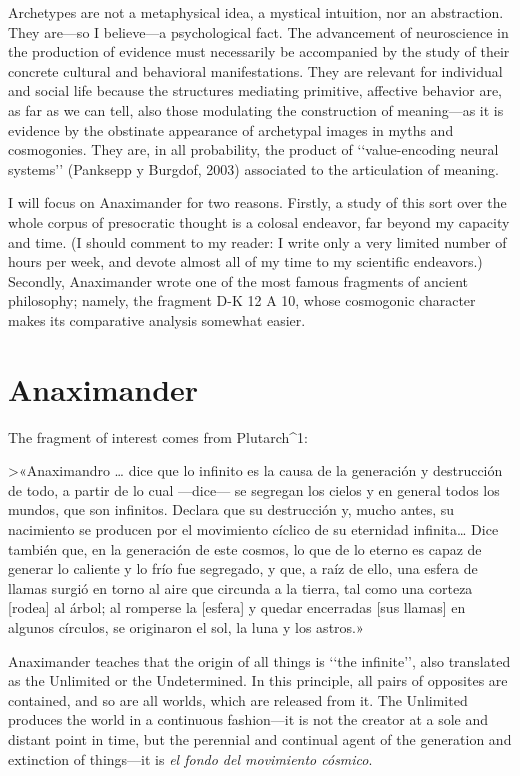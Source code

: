\documentclass[a4paper]{article}
\begin{document}
Archetypes are not a metaphysical idea, a mystical intuition, nor an
abstraction. They are---so I believe---a psychological fact. The advancement of
neuroscience in the production of evidence must necessarily be accompanied by
the study of their concrete cultural and behavioral manifestations. They are
relevant for individual and social life because the structures mediating
primitive, affective behavior are, as far as we can tell, also those modulating
the construction of meaning---as it is evidence by the obstinate appearance of
archetypal images in myths and cosmogonies. They are, in all probability, the
product of \lq\lq value-encoding neural systems\rq\rq{} (Panksepp y Burgdof,
2003) associated to the articulation of meaning.

I will focus on Anaximander for two reasons. Firstly, a study of this sort over
the whole corpus of presocratic thought is a colosal endeavor, far beyond my
capacity and time. (I should comment to my reader: I write only a very limited
number of hours per week, and devote almost all of my time to my scientific
endeavors.) Secondly, Anaximander wrote one of the most famous fragments of
ancient philosophy; namely, the fragment D-K 12 A 10, whose cosmogonic character
makes its comparative analysis somewhat easier. 

\section{Anaximander}

The fragment of interest comes from Plutarch^1:

>«Anaximandro … dice que lo infinito es la causa de la generación y destrucción
de todo, a partir de lo cual —dice— se segregan los cielos y en general todos
los mundos, que son infinitos. Declara que su destrucción y, mucho antes, su
nacimiento se producen por el movimiento cíclico de su eternidad infinita… Dice
también que, en la generación de este cosmos, lo que de lo eterno es capaz de
generar lo caliente y lo frío fue segregado, y que, a raíz de ello, una esfera
de llamas surgió en torno al aire que circunda a la tierra, tal como una corteza
[rodea] al árbol; al romperse la [esfera] y quedar encerradas [sus llamas] en
algunos círculos, se originaron el sol, la luna y los astros.»

Anaximander teaches that the origin of all things is \lq\lq the
infinite\rq\rq{}, also translated as the Unlimited or the Undetermined. In this
principle, all pairs of opposites are contained, and so are all worlds, which
are released from it. The Unlimited produces the world in a continuous
fashion---it is not the creator at a sole and distant point in time, but the
perennial and continual agent of the generation and extinction of
things---it is \textit{el fondo del movimiento cósmico}. 
\end{document}
